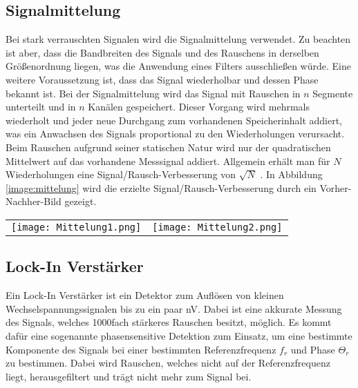 \subsection{Signalmittelung}
\label{sub:mittelung}
Bei stark verrauschten Signalen wird die Signalmittelung verwendet. Zu beachten ist aber, dass die Bandbreiten des Signals und des Rauschens in derselben Größenordnung liegen, was die Anwendung eines Filters ausschließen würde. Eine weitere Voraussetzung ist, dass das Signal wiederholbar und dessen Phase bekannt ist. Bei der Signalmittelung wird das Signal mit Rauschen in $n$ Segmente unterteilt und in $n$ Kanälen gespeichert. Dieser Vorgang wird mehrmals wiederholt und jeder neue Durchgang zum vorhandenen Speicherinhalt addiert, was ein Anwachsen des Signals proportional zu den Wiederholungen verursacht. Beim Rauschen aufgrund seiner statischen Natur wird nur der quadratischen Mittelwert auf das vorhandene Messsignal addiert. Allgemein erhält man für $N$ Wiederholungen eine Signal/Rausch-Verbesserung von $\sqrt{N}$ \citep{VA}. In Abbildung \ref{image:mittelung} wird die erzielte Signal/Rausch-Verbesserung durch ein Vorher-Nachher-Bild gezeigt.
\begin{center}
    \begin{tabular}{c c}
        \texttt{[image: Mittelung1.png]} &
        \texttt{[image: Mittelung2.png]}  
    \end{tabular}
    \label{image:mittelung}
\end{center}
\newpage
\subsection{Lock-In Verstärker}
\label{sub:lockin}
Ein Lock-In Verstärker ist ein Detektor zum Auflösen von kleinen Wechselspannungssignalen bis zu ein paar nV. Dabei ist eine akkurate Messung des Signals, welches 1000fach stärkeres Rauschen besitzt, möglich. Es kommt dafür eine sogenannte phasensensitive Detektion zum Einsatz, um eine bestimmte Komponente des Signals bei einer bestimmten Referenzfrequenz $f_{r}$ und Phase $\Theta_{r}$ zu bestimmen. Dabei wird Rauschen, welches nicht auf der Referenzfrequenz liegt, herausgefiltert und trägt nicht mehr zum Signal bei.
